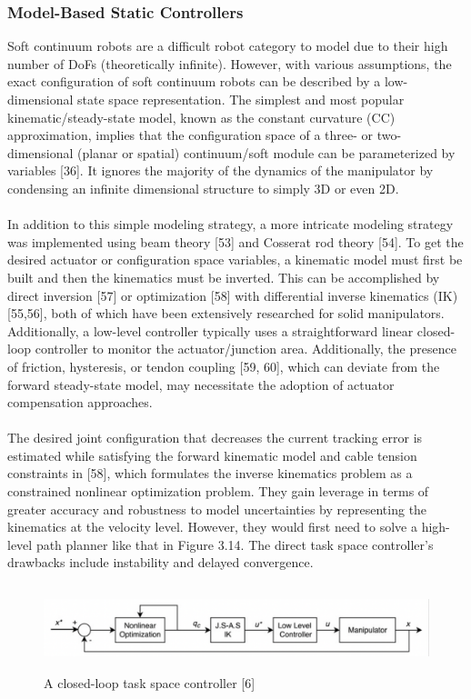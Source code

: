 \documentclass[12pt,twoside,a4]{mwbk}
\begin{document}
\subsubsection{Model-Based Static Controllers}
Soft continuum robots are a difficult robot category to model due to their high number of DoFs (theoretically infinite). However, with various assumptions, the exact configuration of soft continuum robots can be described by a low-dimensional state space representation. The simplest and most popular kinematic/steady-state model, known as the constant curvature (CC) approximation, implies that the configuration space of a three- or two-dimensional (planar or spatial) continuum/soft module can be parameterized by variables [36]. It ignores the majority of the dynamics of the manipulator by condensing an infinite dimensional structure to simply 3D or even 2D. 
\\ \\ 
In addition to this simple modeling strategy, a more intricate modeling strategy was implemented using beam theory [53] and Cosserat rod theory [54]. To get the desired actuator or configuration space variables, a kinematic model must first be built and then the kinematics must be inverted. This can be accomplished by direct inversion [57] or optimization [58] with differential inverse kinematics (IK) [55,56], both of which have been extensively researched for solid manipulators. Additionally, a low-level controller typically uses a straightforward linear closed-loop controller to monitor the actuator/junction area. Additionally, the presence of friction, hysteresis, or tendon coupling [59, 60], which can deviate from the forward steady-state model, may necessitate the adoption of actuator compensation approaches.
\\ \\ 
The desired joint configuration that decreases the current tracking error is estimated while satisfying the forward kinematic model and cable tension constraints in [58], which formulates the inverse kinematics problem as a constrained nonlinear optimization problem. They gain leverage in terms of greater accuracy and robustness to model uncertainties by representing the kinematics at the velocity level. However, they would first need to solve a high-level path planner like that in Figure 3.14. The direct task space controller's drawbacks include instability and delayed convergence.
\begin{figure}[h]
    \centering
    \includegraphics[width=15.3cm, height=2.5cm]{cont1.png}
    \caption{A closed-loop task space controller [6]}
\end{figure}
\end{document}
